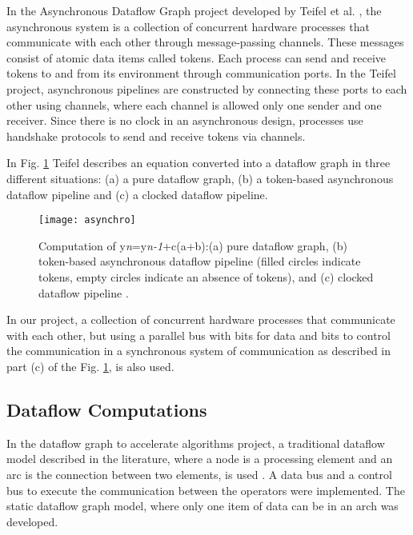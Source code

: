\documentclass[preprint,12pt]{elsarticle}
\begin{document}
In the Asynchronous Dataflow Graph project developed by Teifel et al.   \cite{r82}, the asynchronous system is a collection of concurrent hardware processes that communicate with each other through message-passing channels. These messages consist of atomic data items called tokens. Each process can send and receive tokens to and from its environment through communication ports.  In the Teifel project, asynchronous pipelines are constructed by connecting these ports to each other using channels, where each channel is allowed only
one sender and one receiver. Since there is no clock in an asynchronous design, processes use handshake protocols to send and receive tokens via channels.

In Fig. \ref{f1} Teifel describes an equation converted into a dataflow graph in three different situations: (a) a pure dataflow graph, (b) a token-based asynchronous dataflow pipeline and (c) a clocked dataflow pipeline.


\begin{figure}[h]
\begin{center}
   \texttt{[image: asynchro]}
   \caption{Computation of y{\tiny \emph{n}}=y{\tiny \emph{n-1}}+c(a+b):(a) pure dataflow graph, (b) token-based asynchronous dataflow pipeline (filled circles indicate tokens,
empty circles indicate an absence of tokens), and (c) clocked dataflow pipeline \cite{r82}.} \label{f1}
\end{center}
\end{figure}


In our project, a collection of concurrent hardware processes that communicate with each other, but using a parallel bus with bits for data and bits to control the communication in a synchronous system of communication as described in part (c) of the Fig. \ref{f1}, is also used.


\subsection{Dataflow Computations}

In the dataflow graph to accelerate algorithms project, a traditional dataflow model described in the literature, where a node is a processing element and an arc is the connection between two elements, is used \cite{r5,r12,r22,r71,r72}. A data bus and a control bus to execute the communication between the operators were implemented. The static dataflow graph model, where only one item of data can be in an arch was developed.
\end{document}

